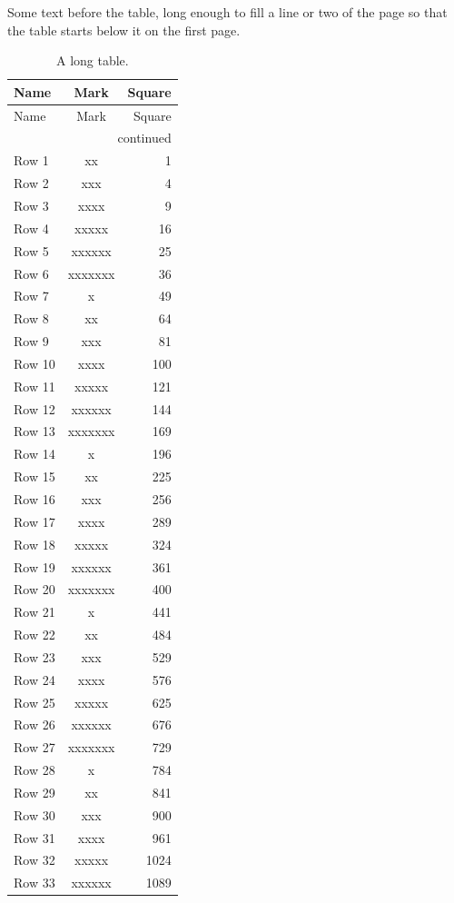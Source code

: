 \documentclass{article}
\begin{document}
Some text before the table, long enough to fill a line or two of the page so that the table starts below it on
the first page.

\begin{longtable}{|l|c|r|}
\caption{A long table.}\\
\hline
Name & Mark & Square \\
\hline\hline
\endfirsthead
\hline
Name & Mark & Square \\
\hline
\endhead
\hline
\multicolumn{3}{r}{continued} \\
\endfoot
\hline
\endlastfoot
Row 1 & xx & 1 \\
Row 2 & xxx & 4 \\
Row 3 & xxxx & 9 \\
Row 4 & xxxxx & 16 \\
Row 5 & xxxxxx & 25 \\
Row 6 & xxxxxxx & 36 \\
Row 7 & x & 49 \\
Row 8 & xx & 64 \\
Row 9 & xxx & 81 \\
Row 10 & xxxx & 100 \\
Row 11 & xxxxx & 121 \\
Row 12 & xxxxxx & 144 \\
Row 13 & xxxxxxx & 169 \\
Row 14 & x & 196 \\
Row 15 & xx & 225 \\
Row 16 & xxx & 256 \\
Row 17 & xxxx & 289 \\
Row 18 & xxxxx & 324 \\
Row 19 & xxxxxx & 361 \\
Row 20 & xxxxxxx & 400 \\
Row 21 & x & 441 \\
Row 22 & xx & 484 \\
Row 23 & xxx & 529 \\
Row 24 & xxxx & 576 \\
Row 25 & xxxxx & 625 \\
Row 26 & xxxxxx & 676 \\
Row 27 & xxxxxxx & 729 \\
Row 28 & x & 784 \\
Row 29 & xx & 841 \\
Row 30 & xxx & 900 \\
Row 31 & xxxx & 961 \\
Row 32 & xxxxx & 1024 \\
Row 33 & xxxxxx & 1089 \\

\end{longtable}
\end{document}
